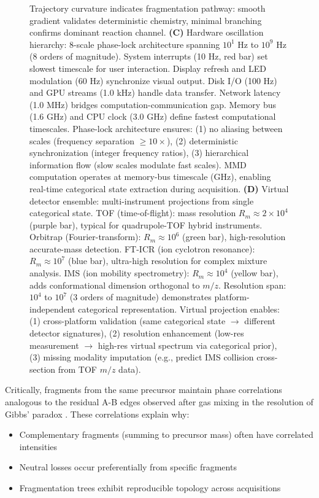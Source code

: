 \documentclass[twocolumn,10pt,a4paper]{article}
\theoremstyle{definition}
\theoremstyle{remark}
\begin{document}
\begin{figure}[htbp]
{Trajectory curvature indicates fragmentation pathway: smooth gradient validates deterministic chemistry, minimal branching confirms dominant reaction channel. 
\textbf{(C)} Hardware oscillation hierarchy: 8-scale phase-lock architecture spanning $10^{1}$ Hz to $10^{9}$ Hz (8 orders of magnitude). 
System interrupts (10 Hz, red bar) set slowest timescale for user interaction. 
Display refresh and LED modulation (60 Hz) synchronize visual output. 
Disk I/O (100 Hz) and GPU streams (1.0 kHz) handle data transfer. 
Network latency (1.0 MHz) bridges computation-communication gap. 
Memory bus (1.6 GHz) and CPU clock (3.0 GHz) define fastest computational timescales. 
Phase-lock architecture ensures: (1) no aliasing between scales (frequency separation $\geq 10\times$), (2) deterministic synchronization (integer frequency ratios), (3) hierarchical information flow (slow scales modulate fast scales). 
MMD computation operates at memory-bus timescale (GHz), enabling real-time categorical state extraction during acquisition. 
\textbf{(D)} Virtual detector ensemble: multi-instrument projections from single categorical state. 
TOF (time-of-flight): mass resolution $R_{m} \approx 2 \times 10^{4}$ (purple bar), typical for quadrupole-TOF hybrid instruments. 
Orbitrap (Fourier-transform): $R_{m} \approx 10^{6}$ (green bar), high-resolution accurate-mass detection. 
FT-ICR (ion cyclotron resonance): $R_{m} \approx 10^{7}$ (blue bar), ultra-high resolution for complex mixture analysis. 
IMS (ion mobility spectrometry): $R_{m} \approx 10^{4}$ (yellow bar), adds conformational dimension orthogonal to $m/z$. 
Resolution span: $10^{4}$ to $10^{7}$ (3 orders of magnitude) demonstrates platform-independent categorical representation. 
Virtual projection enables: (1) cross-platform validation (same categorical state $\rightarrow$ different detector signatures), (2) resolution enhancement (low-res measurement $\rightarrow$ high-res virtual spectrum via categorical prior), (3) missing modality imputation (e.g., predict IMS collision cross-section from TOF $m/z$ data).}
\label{fig:mmd_architecture}
\end{figure}



Critically, fragments from the same precursor maintain phase correlations analogous to the residual A-B edges observed after gas mixing in the resolution of Gibbs' paradox \cite{sachikonye2024gibbs}. These correlations explain why:
\begin{itemize}
\item Complementary fragments (summing to precursor mass) often have correlated intensities
\item Neutral losses occur preferentially from specific fragments
\item Fragmentation trees exhibit reproducible topology across acquisitions
\end{itemize}
\end{document}
